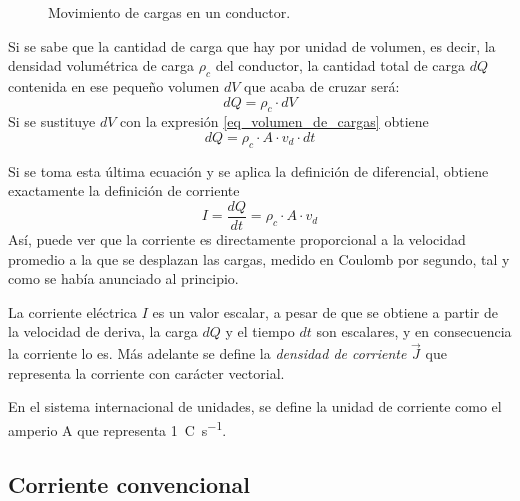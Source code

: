 \begin{figure}[!ht]
  \centering
  
  \caption{Movimiento de cargas en un conductor.}
  \label{fig_cargas_libres}
\end{figure}

Si se sabe que la cantidad de carga que hay por unidad de volumen, es decir, la densidad volumétrica de carga \(\rho_c\) del conductor, la cantidad total de carga \(dQ\) contenida en ese pequeño volumen \(dV\) que acaba de cruzar será:
\[
  dQ=\rho_c\cdot dV
\]
Si se sustituye \(dV\) con la expresión \eqref{eq_volumen_de_cargas} obtiene
\[
  dQ = \rho_c \cdot A \cdot v_d \cdot dt
\]

Si se toma esta última ecuación y se aplica la definición de diferencial, obtiene exactamente la definición de corriente 
\begin{equation}
  \boxed{
    I=\frac{dQ}{dt}=\rho_c\cdot A\cdot v_d
  }
\end{equation}
Así, puede ver que la corriente es directamente proporcional a la velocidad promedio a la que se desplazan las cargas, medido en Coulomb por segundo, tal y como se había anunciado al principio.

\begin{tcolorbox}[mydanger]
  La corriente eléctrica \(I\) es un valor escalar, a pesar de que se obtiene a partir de la velocidad de deriva, la carga \(dQ\) y el tiempo \(dt\) son escalares, y en consecuencia la corriente lo es. Más adelante se define la \emph{densidad de corriente} \(\vec{J}\) que representa la corriente con carácter vectorial.
\end{tcolorbox}

En el sistema internacional de unidades, se define la unidad de corriente como el amperio \unit{\ampere} que representa \qty{1}{\coulomb\per\second}.

\subsection{Corriente convencional}


